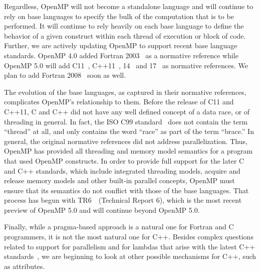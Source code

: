 Regardless, OpenMP will not become a standalone language and will 
continue to rely on base languages to specify the bulk of the
computation that is to be performed. It will continue to rely heavily 
on each base language to define the behavior of a given construct 
within each thread of execution or block of code. Further, we are
actively updating OpenMP to support recent base language standards. 
OpenMP 4.0 added Fortran 2003~\cite{F2003} as a normative reference
while OpenMP 5.0 will add C11~\cite{c11}, C++11~\cite{c++11},
14~\cite{c++14} and 17~\cite{c++17} as normative references. We plan to add
Fortran 2008~\cite{F2008} soon as well.

The evolution of the base languages, as captured in their normative
references, complicates OpenMP's relationship to them. Before the 
release of C11 and C++11, C and C++ did not have any well defined 
concept of a data race, or of threading in general. In fact, the 
ISO C99 standard~\cite{c99} does not contain the term ``thread'' at all,
and only contains the word ``race'' as part of the term ``brace.''
In general, the original normative references did not address
parallelization. Thus, OpenMP has provided all threading and memory 
model semantics for a program that used OpenMP constructs. In 
order to provide full support for the later C and C++ standards, 
which include integrated threading models, acquire and release 
memory models and other built-in parallel concepts, OpenMP must 
ensure that its semantics do not conflict with those of the base
languages. That process has begun with TR6~\cite{openmptr6}~(Technical Report 6), which is 
the most recent preview of OpenMP 5.0 and will continue beyond
OpenMP 5.0.

Finally, while a pragma-based approach is a natural one for Fortran
and C programmers, it is not the most natural one for C++. Besides
complex questions related to support for parallelism and for lambdas
that arise with the latest C++ standards~\cite{c++17}, we are beginning to look at
other possible mechanisms for C++, such as attributes.



